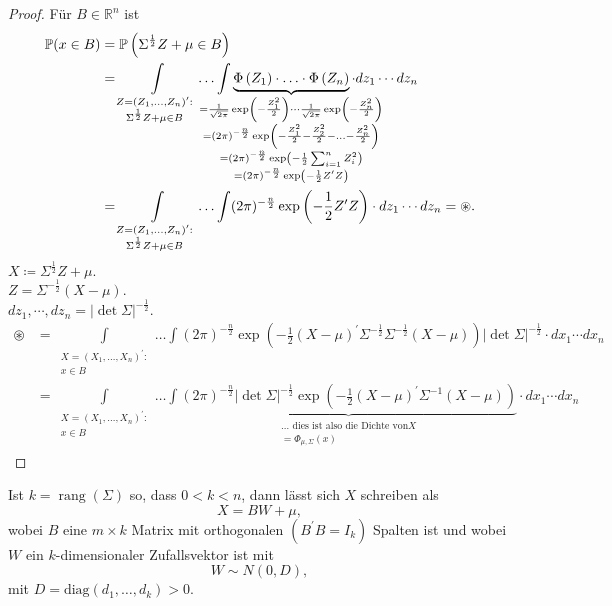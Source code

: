 \documentclass{tstextbook}
\DeclareMathOperator{\rang}{rang}
\newcommand{\R}{\mathbb R}
\newcommand{\Prob}{\mathbb P}
\begin{document}
\begin{proof}
	Für $ B \in \R^n $ ist 
	\[ \begin{aligned}
		\Prob(x \in B) & = \Prob \left( \Sigma^{\frac{1}{2}} Z + \mu \in B \right) \\
		& = \int\limits_{\substack{Z=(Z_1,\ldots,Z_n)^\prime : \\ \Sigma^{\frac{1}{2}} Z + \mu \in B}} \ldots \int \underbrace{\Phi \left( Z_1\right) \cdot \ldots \cdot \Phi \left(Z_n\right)}_{\mathclap{\substack{= \frac{1}{\sqrt{2\pi}} \exp\left( {-\frac{Z_1^2}{2}}\right)  \cdots \frac{1}{\sqrt{2\pi}} \exp\left( {-\frac{Z_n^2}{2}}\right)  \\
		= (2\pi)^{-\frac{n}{2}} \exp\left( {-\frac{Z_1^2}{2}-\frac{Z_2^2}{2}-\ldots - \frac{Z_n^2}{2}}\right) \\
		= (2\pi)^{-\frac{n}{2}} \exp\left(-\frac{1}{2} \sum_{i=1}^{n} Z_i^2 \right) \\
		= (2\pi)^{-\frac{n}{2}} \exp\left(-\frac{1}{2}Z^\prime Z \right)  }}} \cdot dz_1 \cdots  dz_n \\
		& = \int\limits_{\substack{Z=(Z_1,\ldots,Z_n)^\prime : \\ \Sigma^{\frac{1}{2}} Z + \mu \in B}} \ldots \int (2\pi)^{-\frac{n}{2}} \exp\left(-\frac{1}{2}Z^\prime Z \right) \cdot dz_1 \cdots  dz_n = \circledast.
	\end{aligned}
	\]
	$ X \coloneqq \Sigma^{\frac{1}{2}} Z + \mu. $ \\
	$ Z = \Sigma^{-\frac{1}{2}} (X-\mu). $ \\
	$ dz_1,\cdots, dz_n = |\det\Sigma|^{-\frac{1}{2}}. $
	\[
	\begin{aligned}
		\circledast & = \int\limits_{\substack{X=(X_1,\ldots,X_n)^\prime : \\ x \in B}} \ldots \int (2\pi)^{-\frac{n}{2}} \exp\left(-\frac{1}{2}(X-\mu)^\prime \Sigma^{-\frac{1}{2}} \Sigma^{-\frac{1}{2}} (X-\mu) \right) |\det \Sigma |^{-\frac{1}{2}}  \cdot dx_1 \cdots  dx_n \\
		& = \int\limits_{\substack{X=(X_1,\ldots,X_n)^\prime : \\ x \in B}} \ldots \int \underbrace{(2\pi)^{-\frac{n}{2}} |\det \Sigma |^{-\frac{1}{2}} \exp\left(-\frac{1}{2}(X-\mu)^\prime \Sigma^{-1} (X-\mu) \right)}_{\substack{\ldots\text{ dies ist also die Dichte von} X \\ = \Phi_{\mu,\Sigma}(x)}}   \cdot dx_1 \cdots  dx_n
	\end{aligned}
	\]

\end{proof}

\begin{theorem}
	
	Ist $ k = \rang(\Sigma) $ so, dass $ 0<k<n $, dann lässt sich $ X $ schreiben als 
	\[
	X = BW+\mu,
	\]
	wobei $ B $ eine $ m\times k $ Matrix mit orthogonalen $ \left(B^\prime B = I_k \right)  $ Spalten ist und wobei $ W $ ein $ k $-dimensionaler Zufallsvektor ist mit 
	\[
	W \sim N(0,D),
	\]
	mit $ D = \text{diag}\left(d_1,\ldots,d_k\right) > 0. $
\end{theorem}
\end{document}
